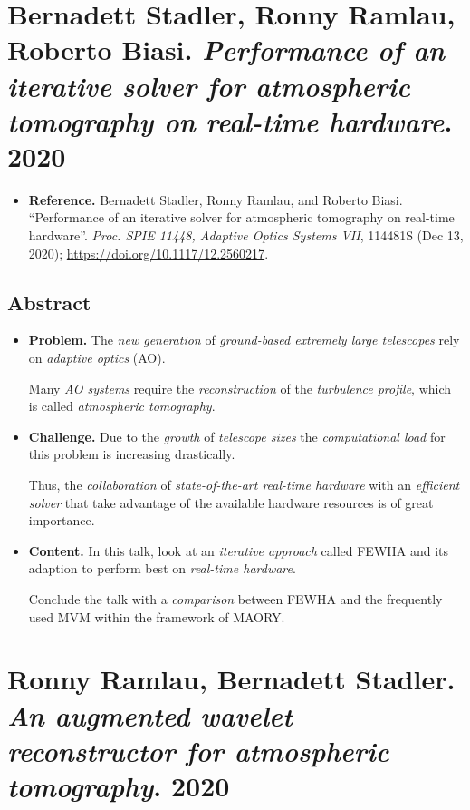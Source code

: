 \documentclass{book}
\numberwithin{equation}{section}
\begin{document}
\section{Bernadett Stadler, Ronny Ramlau, Roberto Biasi. \textit{Performance of an iterative solver for atmospheric tomography on real-time hardware}. 2020}
\begin{itemize}
    \item \textbf{Reference.}  Bernadett Stadler, Ronny Ramlau, and Roberto Biasi. ``Performance of an iterative solver for atmospheric tomography on real-time hardware''. \textit{Proc. SPIE 11448, Adaptive Optics Systems VII}, 114481S (Dec 13, 2020); \url{https://doi.org/10.1117/12.2560217}.
\end{itemize}

\subsection*{Abstract}
\begin{itemize}
    \item \textbf{Problem.} The \textit{new generation} of \textit{ground-based extremely large telescopes} rely on \textit{adaptive optics} (AO).
    
    Many \textit{AO systems} require the \textit{reconstruction} of the \textit{turbulence profile}, which is called \textit{atmospheric tomography}.
    \item \textbf{Challenge.} Due to the \textit{growth} of \textit{telescope sizes} the \textit{computational load} for this problem is increasing drastically.
    
    Thus, the \textit{collaboration} of \textit{state-of-the-art real-time hardware} with an \textit{efficient solver} that take advantage of the available hardware resources is of great importance.
    \item \textbf{Content.} In this talk, look at an \textit{iterative approach} called FEWHA and its adaption to perform best on \textit{real-time hardware}.
    
    Conclude the talk with a \textit{comparison} between FEWHA and the frequently used MVM within the framework of MAORY.
\end{itemize}

\section{Ronny Ramlau, Bernadett Stadler. \textit{An augmented wavelet reconstructor for atmospheric tomography}. 2020}
\end{document}
